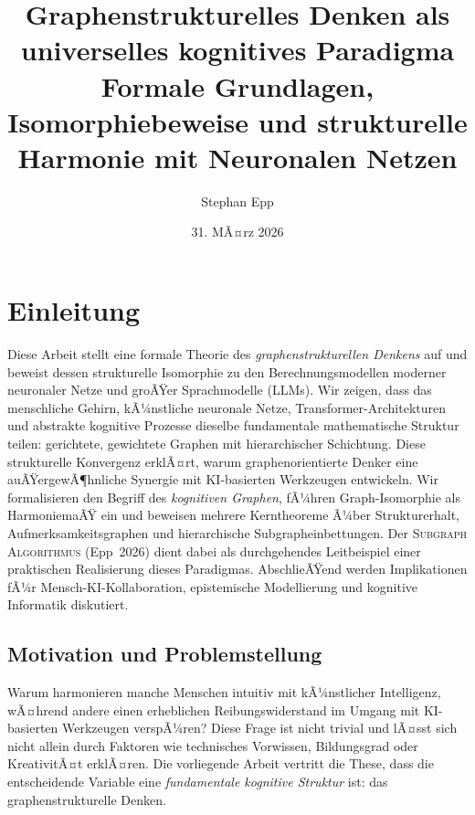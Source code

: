 ﻿\documentclass[12pt,a4paper]{article}
\title{\textbf{Graphenstrukturelles Denken als universelles kognitives Paradigma} \\ 
	\Large Formale Grundlagen, Isomorphiebeweise und strukturelle Harmonie mit Neuronalen Netzen}
\author{Stephan Epp}
\date{31. MÃ¤rz 2026}
\theoremstyle{plain}
\theoremstyle{definition}
\theoremstyle{remark}
\newcommand{\SA}{\textnormal{\textsc{Subgraph Algorithmus}}}
\begin{document}
\maketitle
\tableofcontents
\newpage

\section{Einleitung}
\label{sec:einleitung}

Diese Arbeit stellt eine formale Theorie des \emph{graphenstrukturellen Denkens} auf und beweist dessen strukturelle Isomorphie zu den Berechnungsmodellen moderner neuronaler Netze und groÃŸer Sprachmodelle (LLMs). Wir zeigen, dass das menschliche Gehirn, kÃ¼nstliche neuronale Netze, Transformer-Architekturen und abstrakte kognitive Prozesse dieselbe fundamentale mathematische Struktur teilen: gerichtete, gewichtete Graphen mit hierarchischer Schichtung. Diese strukturelle Konvergenz erklÃ¤rt, warum graphenorientierte Denker eine auÃŸergewÃ¶hnliche Synergie mit KI-basierten Werkzeugen entwickeln. Wir formalisieren den Begriff des \emph{kognitiven Graphen}, fÃ¼hren Graph-Isomorphie als HarmoniemaÃŸ ein und beweisen mehrere Kerntheoreme Ã¼ber Strukturerhalt, Aufmerksamkeitsgraphen und hierarchische Subgrapheinbettungen. Der \SA{} (Epp~2026) dient dabei als durchgehendes Leitbeispiel einer praktischen Realisierung dieses Paradigmas. AbschlieÃŸend werden Implikationen fÃ¼r Mensch-KI-Kollaboration, epistemische Modellierung und kognitive Informatik diskutiert.

\subsection{Motivation und Problemstellung}

Warum harmonieren manche Menschen intuitiv mit kÃ¼nstlicher Intelligenz, wÃ¤hrend andere einen erheblichen Reibungswiderstand im Umgang mit KI-basierten Werkzeugen verspÃ¼ren? Diese Frage ist nicht trivial und lÃ¤sst sich nicht allein durch Faktoren wie technisches Vorwissen, Bildungsgrad oder KreativitÃ¤t erklÃ¤ren. Die vorliegende Arbeit vertritt die These, dass die entscheidende Variable eine \emph{fundamentale kognitive Struktur} ist: das graphenstrukturelle Denken.
\end{document}
